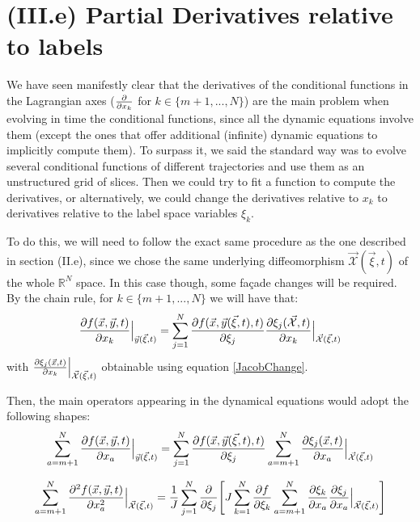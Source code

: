 \documentclass[11pt, a4paper]{article} %
\newcommand{\R}{\mathbb{R}} %
\newcommand{\x}{\mathcal{X}}
\begin{document}
\newpage
\section*{(III.e) Partial Derivatives relative to labels\vspace{-0.1cm}}
We have seen manifestly clear that the derivatives of the conditional functions in the Lagrangian axes ($\pdv{}{x_k}$ for $k\in\{m+1,...,N \}$) are the main problem when evolving in time the conditional functions, since all the dynamic equations involve them (except the ones that offer additional (infinite) dynamic equations to implicitly compute them). To surpass it, we said the standard way was to evolve several conditional functions of different trajectories and use them as an unstructured grid of slices. Then we could try to fit a function to compute the derivatives, or alternatively, we could change the derivatives relative to $x_k$ to derivatives relative to the label space variables $\xi_k$.

To do this, we will need to follow the exact same procedure as the one described in section (II.e), since we chose the same underlying diffeomorphism $\vec{\x}(\vec{\xi},t)$ of the whole $\R^N$ space. In this case though, some façade changes will be required. By the chain rule, for $k\in\{m+1,...,N \}$ we will have that:
\begin{equation}
\pdv{f(\vec{x}, \vec{y},t)}{x_k}\Big\rvert_{\vec{y}(\vec{\xi},t)}=\sum_{j=1}^N \pdv{f(\vec{x},\vec{y}(\vec{\xi},t),t)}{\xi_j} \pdv{\xi_j(\vec{\x},t)}{x_k}\Big\rvert_{\vec{\x}(\vec{\xi},t)}
\end{equation}
with $\pdv{\xi_j(\vec{x},t)}{x_k}\Big\rvert_{\vec{\x}(\vec{\xi},t)}$ obtainable using equation \eqref{JacobChange}.

Then, the main operators appearing in the dynamical equations would adopt the following shapes:
\begin{equation}
\sum_{a=m+1}^N \pdv{f(\vec{x}, \vec{y},t)}{x_a}\Big\rvert_{\vec{y}(\vec{\xi},t)} = \sum_{j=1}^N \pdv{f(\vec{x}, \vec{y}(\vec{\xi},t),t)}{\xi_j} \sum_{a=m+1}^N \pdv{\xi_j(\vec{x},t)}{x_a}\Big\rvert_{\vec{\x}(\vec{\xi},t)}
\end{equation}

\begin{equation}
\sum_{a=m+1}^N \pdv[2]{f(\vec{x},\vec{y},t)}{x_a}\Big\rvert_{\vec{\x}(\vec{\xi},t)}=\frac{1}{J} \sum_{j=1}^N\pdv{}{\xi_j} \qty[ J\sum_{k=1}^N\pdv{f}{\xi_k}\sum_{a=m+1}^N\pdv{\xi_k}{x_a}\pdv{\xi_j}{x_a}\Big\rvert_{\vec{\x}(\vec{\xi},t)}]
\end{equation}
\end{document}
